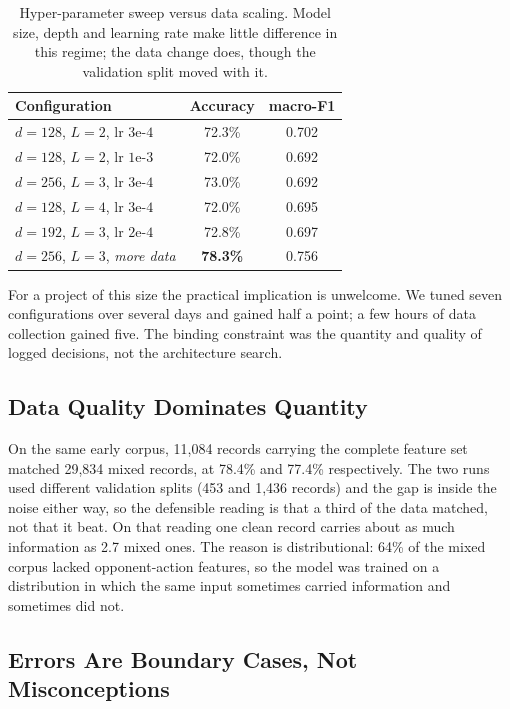 \documentclass[11pt]{article}
\begin{document}
\begin{table}[t]
\centering
\small
\begin{tabular}{@{}lcc@{}}
\toprule
\textbf{Configuration} & \textbf{Accuracy} & \textbf{macro-F1} \\
\midrule
$d{=}128$, $L{=}2$, lr $3\text{e-}4$ & 72.3\% & 0.702 \\
$d{=}128$, $L{=}2$, lr $1\text{e-}3$ & 72.0\% & 0.692 \\
$d{=}256$, $L{=}3$, lr $3\text{e-}4$ & 73.0\% & 0.692 \\
$d{=}128$, $L{=}4$, lr $3\text{e-}4$ & 72.0\% & 0.695 \\
$d{=}192$, $L{=}3$, lr $2\text{e-}4$ & 72.8\% & 0.697 \\
\midrule
$d{=}256$, $L{=}3$, \emph{more data} & \textbf{78.3\%} & 0.756 \\
\bottomrule
\end{tabular}
\caption{Hyper-parameter sweep versus data scaling. Model size, depth and learning rate make
little difference in this regime; the data change does, though the validation split moved
with it.}
\label{tab:hyper}
\end{table}

For a project of this size the practical implication is unwelcome. We tuned seven
configurations over several days and gained half a point; a few hours of data collection
gained five. The binding constraint was the quantity and quality of logged decisions, not
the architecture search.

\subsection{Data Quality Dominates Quantity}
\label{sec:dq}

On the same early corpus, 11,084 records carrying the complete feature set matched 29,834
mixed records, at 78.4\% and 77.4\% respectively. The two runs used different validation
splits (453 and 1,436 records) and the gap is inside the noise either way, so the defensible
reading is that a third of the data matched, not that it beat. On that reading one clean
record carries about as much information as 2.7 mixed ones. The reason is distributional:
64\% of the mixed corpus lacked opponent-action features, so the model was trained on a
distribution in which the same input sometimes carried information and sometimes did not.

\subsection{Errors Are Boundary Cases, Not Misconceptions}
\label{sec:errors}
\end{document}
